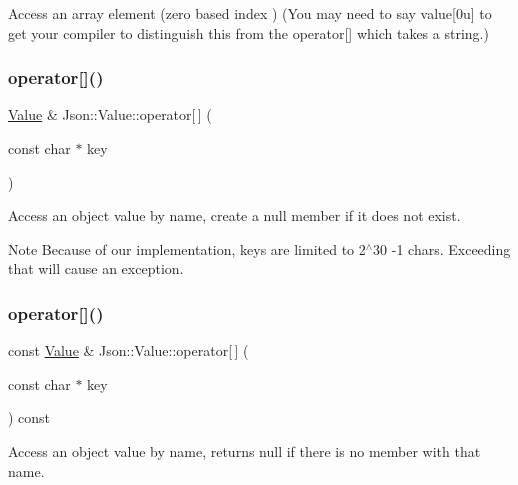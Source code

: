 Access an array element (zero based index ) (You may need to say \textquotesingle{}value\mbox{[}0u\mbox{]}\textquotesingle{} to get your compiler to distinguish this from the operator\mbox{[}\mbox{]} which takes a string.) \mbox{\label{classJson_1_1Value_acb912f4ec40a25ea6eb387730885f3d9}} 
\subsubsection{\texorpdfstring{operator[]()}{operator[]()}\hspace{0.1cm}{\footnotesize\ttfamily [5/9]}}
{\footnotesize\ttfamily \hyperlink{classJson_1_1Value}{Value} \& Json\+::\+Value\+::operator\mbox{[}$\,$\mbox{]} (\begin{DoxyParamCaption}\item[{const char $\ast$}]{key }\end{DoxyParamCaption})}

Access an object value by name, create a null member if it does not exist. \begin{DoxyNote}{Note}
Because of our implementation, keys are limited to 2$^\wedge$30 -\/1 chars. Exceeding that will cause an exception. 
\end{DoxyNote}
\mbox{\label{classJson_1_1Value_a1b0498b7b2a520a68137f682d91abdd5}} 
\subsubsection{\texorpdfstring{operator[]()}{operator[]()}\hspace{0.1cm}{\footnotesize\ttfamily [6/9]}}
{\footnotesize\ttfamily const \hyperlink{classJson_1_1Value}{Value} \& Json\+::\+Value\+::operator\mbox{[}$\,$\mbox{]} (\begin{DoxyParamCaption}\item[{const char $\ast$}]{key }\end{DoxyParamCaption}) const}

Access an object value by name, returns null if there is no member with that name. \mbox{\label{classJson_1_1Value_aedd1e152756a4cc8c1ebac0dd7aeeb78}} 
